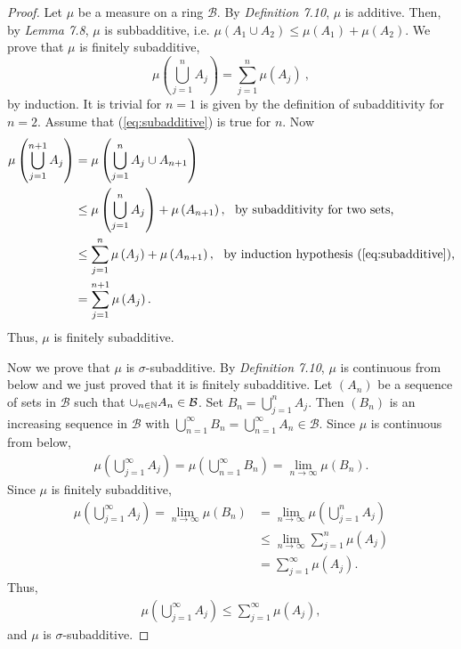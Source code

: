 \begin{questions}


\begin{solution}
  \begin{proof}
Let $\mu$ be a measure on a ring $\mathcal{B}$. By \textit{Definition 7.10}, $\mu$ is additive. Then, by \textit{Lemma 7.8}, $\mu$ is subbadditive, i.e. $\mu(A_1\cup A_2)\leq\mu(A_1)+\mu(A_2)$. We prove that $\mu$ is finitely subadditive,
\begin{equation}\label{eq:subadditive}
\mu\left(\bigcup_{j=1}^nA_j\right)=\sum_{j=1}^n\mu\left(A_j\right)~,
\end{equation}
by induction. It is trivial for $n=1$ is given by the definition of subadditivity for $n=2$. Assume that (\ref{eq:subadditive}) is true for $n$. Now
\begin{align*}
\mu\left(\bigcup_{j=1}^{n+1}A_j\right)&=\mu\left(\bigcup_{j=1}^nA_j\cup A_{n+1}\right)\\
&\leq \mu\left(\bigcup_{j=1}^nA_j\right)+\mu\left(A_{n+1}\right),~~\text{by subadditivity for two sets,}\\
&\leq \sum_{j=1}^n\mu\left(A_j\right)+\mu\left(A_{n+1}\right),~~ \text{by induction hypothesis (\ref{eq:subadditive}),}\\
&=\sum_{j=1}^{n+1}\mu\left(A_j\right).
\end{align*}
Thus, $\mu$ is finitely subadditive.

Now we prove that $\mu$ is $\sigma$-subadditive. By \textit{Definition 7.10}, $\mu$ is continuous from below and we just proved that it is finitely subadditive. Let $(A_n)$ be a sequence of sets in $\mathcal{B}$ such that $\cup_{n\in\mathbb{N}}A_n\in\mathcal{B}$. Set $B_n=\bigcup_{j=1}^nA_j$. Then $(B_n)$ is an increasing sequence in $\mathcal{B}$ with $\bigcup_{n=1}^{\infty}B_n=\bigcup_{n=1}^{\infty}A_n\in\mathcal{B}$. Since $\mu$ is continuous from below,
\begin{align*}
\mu\left(\bigcup_{j=1}^{\infty}A_j\right)=\mu\left(\bigcup_{n=1}^{\infty}B_n\right)=\lim_{n\rightarrow\infty}\mu(B_n).
\end{align*}
Since $\mu$ is finitely subadditive,
\begin{align*}
\mu\left(\bigcup_{j=1}^{\infty}A_j\right)=\lim_{n\rightarrow\infty}\mu(B_n)&=\lim_{n\rightarrow\infty}\mu\left(\bigcup_{j=1}^nA_j\right)\\
&\leq \lim_{n\rightarrow\infty}\sum_{j=1}^n\mu(A_j)\\
&=\sum_{j=1}^{\infty}\mu(A_j).
\end{align*}
Thus,
\begin{align*}
\mu\left(\bigcup_{j=1}^{\infty}A_j\right)\leq \sum_{j=1}^{\infty}\mu(A_j),
\end{align*}
and $\mu$ is $\sigma$-subadditive.
\end{proof}
\end{solution}
\end{questions}